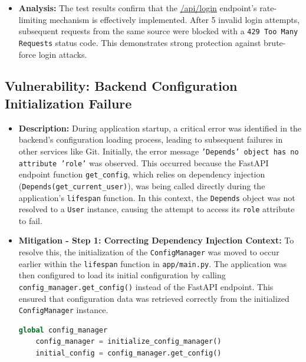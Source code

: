\documentclass{article}
\begin{document}
\begin{itemize}
    \item \textbf{Analysis:}
    The test results confirm that the \url{/api/login} endpoint's rate-limiting mechanism is effectively implemented. After 5 invalid login attempts, subsequent requests from the same source were blocked with a \texttt{429 Too Many Requests} status code. This demonstrates strong protection against brute-force login attacks.
\end{itemize}

\subsection{\textbf{Vulnerability: Backend Configuration Initialization Failure}}
\begin{itemize}
    \item \textbf{Description:}
    During application startup, a critical error was identified in the backend's configuration loading process, leading to subsequent failures in other services like Git. Initially, the error message \texttt{'Depends' object has no attribute 'role'} was observed. This occurred because the FastAPI endpoint function \texttt{get\_config}, which relies on dependency injection (\texttt{Depends(get\_current\_user)}), was being called directly during the application's \texttt{lifespan} function. In this context, the \texttt{Depends} object was not resolved to a \texttt{User} instance, causing the attempt to access its \texttt{role} attribute to fail.
    \item \textbf{Mitigation - Step 1: Correcting Dependency Injection Context:}
    To resolve this, the initialization of the \texttt{ConfigManager} was moved to occur earlier within the \texttt{lifespan} function in \texttt{app/main.py}. The application was then configured to load its initial configuration by calling \texttt{config\_manager.get\_config()} instead of the FastAPI endpoint. This ensured that configuration data was retrieved correctly from the initialized \texttt{ConfigManager} instance.

    \begin{lstlisting}[language=Python, caption=Partial Fix for Config Loading in \texttt{app/main.py}]
    global config_manager
    config_manager = initialize_config_manager()
    initial_config = config_manager.get_config()
    \end{lstlisting}


\end{itemize}
\end{document}
